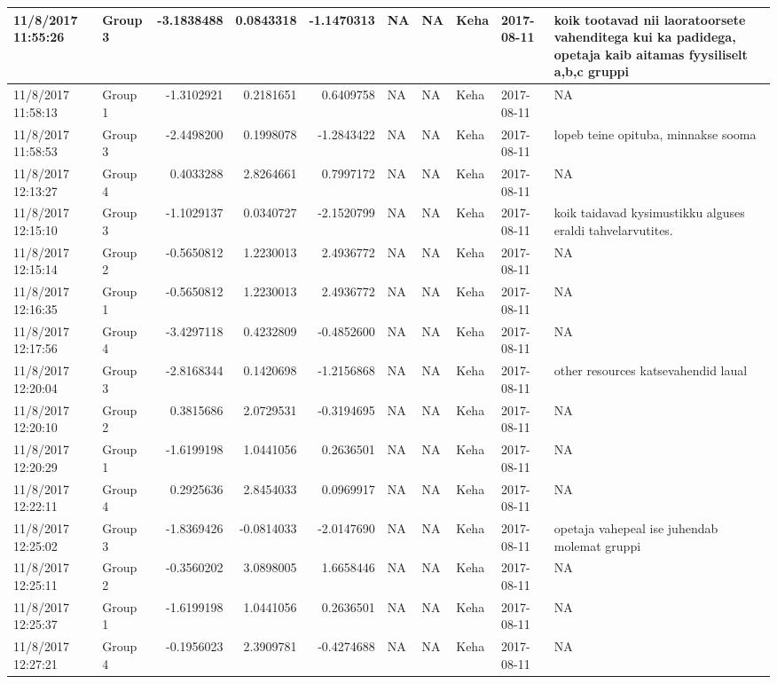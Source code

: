\documentclass[]{article}
\begin{document}
\begin{tabular}{l|l|r|r|r|l|l|l|l|l}
\hline
11/8/2017 11:55:26 & Group 3 & -3.1838488 & 0.0843318 & -1.1470313 & NA & NA & Keha & 2017-08-11 & koik tootavad nii laoratoorsete vahenditega  kui ka padidega, opetaja kaib aitamas fyysiliselt a,b,c gruppi\\
\hline
11/8/2017 11:58:13 & Group 1 & -1.3102921 & 0.2181651 & 0.6409758 & NA & NA & Keha & 2017-08-11 & NA\\
\hline
11/8/2017 11:58:53 & Group 3 & -2.4498200 & 0.1998078 & -1.2843422 & NA & NA & Keha & 2017-08-11 & lopeb teine opituba, minnakse sooma\\
\hline
11/8/2017 12:13:27 & Group 4 & 0.4033288 & 2.8264661 & 0.7997172 & NA & NA & Keha & 2017-08-11 & NA\\
\hline
11/8/2017 12:15:10 & Group 3 & -1.1029137 & 0.0340727 & -2.1520799 & NA & NA & Keha & 2017-08-11 & koik taidavad kysimustikku alguses eraldi tahvelarvutites.\\
\hline
11/8/2017 12:15:14 & Group 2 & -0.5650812 & 1.2230013 & 2.4936772 & NA & NA & Keha & 2017-08-11 & NA\\
\hline
11/8/2017 12:16:35 & Group 1 & -0.5650812 & 1.2230013 & 2.4936772 & NA & NA & Keha & 2017-08-11 & NA\\
\hline
11/8/2017 12:17:56 & Group 4 & -3.4297118 & 0.4232809 & -0.4852600 & NA & NA & Keha & 2017-08-11 & NA\\
\hline
11/8/2017 12:20:04 & Group 3 & -2.8168344 & 0.1420698 & -1.2156868 & NA & NA & Keha & 2017-08-11 & other resources katsevahendid laual\\
\hline
11/8/2017 12:20:10 & Group 2 & 0.3815686 & 2.0729531 & -0.3194695 & NA & NA & Keha & 2017-08-11 & NA\\
\hline
11/8/2017 12:20:29 & Group 1 & -1.6199198 & 1.0441056 & 0.2636501 & NA & NA & Keha & 2017-08-11 & NA\\
\hline
11/8/2017 12:22:11 & Group 4 & 0.2925636 & 2.8454033 & 0.0969917 & NA & NA & Keha & 2017-08-11 & NA\\
\hline
11/8/2017 12:25:02 & Group 3 & -1.8369426 & -0.0814033 & -2.0147690 & NA & NA & Keha & 2017-08-11 & opetaja vahepeal ise juhendab molemat gruppi\\
\hline
11/8/2017 12:25:11 & Group 2 & -0.3560202 & 3.0898005 & 1.6658446 & NA & NA & Keha & 2017-08-11 & NA\\
\hline
11/8/2017 12:25:37 & Group 1 & -1.6199198 & 1.0441056 & 0.2636501 & NA & NA & Keha & 2017-08-11 & NA\\
\hline
11/8/2017 12:27:21 & Group 4 & -0.1956023 & 2.3909781 & -0.4274688 & NA & NA & Keha & 2017-08-11 & NA\\

\end{tabular}
\end{document}
